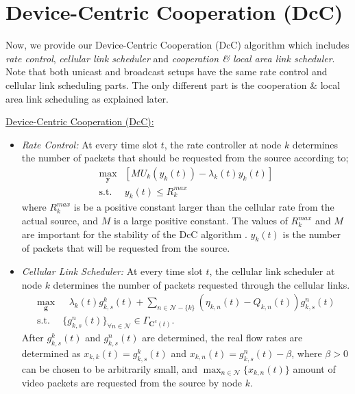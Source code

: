 \documentclass[conference]{IEEEtran}
\newcommand{\Nset}{\mathcal{N}}
\begin{document}
\section{\label{sec:DcC} Device-Centric Cooperation (DcC)}
Now, we provide our Device-Centric Cooperation (DcC) algorithm  which includes {\em rate control}, {\em cellular link scheduler} and {\em cooperation \& local area link scheduler}. Note that both unicast and broadcast setups have the same rate control and cellular link scheduling parts. The only different part is the cooperation \& local area link scheduling as explained later.

\underline{Device-Centric Cooperation (DcC):}
\begin{itemize}
 \item {\em Rate Control:} At every time slot $t$, the rate controller at node $k$ determines the number of packets that should be requested from the source according to;
\begin{align} \label{eq:rate_control}
\max_{\boldsymbol {{y}}} & [MU_{k}({y}_k(t)) -  {\lambda}_{k}(t) {y}_{k}(t) ] \nonumber \\
\mbox{s.t. } &  {y}_k(t) \leq R_{k}^{max}
\end{align} where $R_{k}^{max}$ is be a positive constant larger than the cellular rate from the actual source, and $M$ is a large positive constant. The values of $R_{k}^{max}$ and $M$ are important for the stability of the DcC algorithm \cite{thisTechRep}.
${y}_k(t)$ is the number of packets that will be requested from the source.


 \item {\em Cellular Link Scheduler:} At every time slot $t$, the cellular link scheduler at node $k$  determines the number of packets requested through the cellular links.
\begin{align} \label{eq:cellular_scheduling}
\max_{\boldsymbol {{g}}} & \mbox{  }  {\lambda}_{k}(t) {g}_{k,s}^{k}(t) + \sum_{n \in \Nset-\{k\}} ({\eta}_{k,n}(t) - Q_{k,n}(t) ){g}_{k,s}^{n}(t) \nonumber \\
  \mbox{s.t. } & \{{g}_{k,s}^{n}(t)\}_{\forall n \in \Nset} \in \Gamma_{\boldsymbol C^c(t)}.
  \end{align} After $g_{k,s}^{k}(t)$ and ${g}_{k,s}^{n}(t)$ are determined, the real flow rates are determined as ${x}_{k,k}(t) = {g}_{k,s}^{k}(t)$ and ${x}_{k,n}(t) = {g}_{k,s}^{n}(t) - \beta$, where $\beta > 0$ can be chosen to be arbitrarily small, and $\max_{n \in \Nset}\{x_{k,n}(t)\}$ amount of video packets are requested from the source by node $k$.


\end{itemize}
\end{document}
